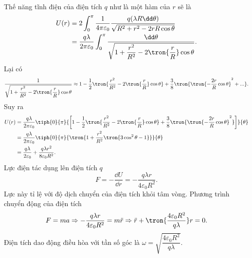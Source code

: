\begin{loigiai}
\begin{center}
\begin{tikzpicture}[x=0.75pt,y=0.75pt,yscale=-1,xscale=1]
\end{tikzpicture}

        \end{center}
        Thế năng tĩnh điện của điện tích $q$ như là một hàm của $r$ sẽ là
        \begin{equation*}
        \begin{aligned}
           U(r)&=2\int_{0}^\pi{\dfrac{1}{4\pi \varepsilon_0}\dfrac{q(\lambda R\dd \theta)}{\sqrt{R^2+r^2-2rR\cos \theta}}}\\
           &=\dfrac{q\lambda}{2\pi \varepsilon_0}\int_0^\pi\dfrac{\dd \theta}{\sqrt{1+\dfrac{r^2}{R^2}-2\tron{\dfrac{r}{R}}\cos \theta}}.
        \end{aligned}
        \end{equation*}
        Lại có 
        \begin{equation*}
            \dfrac{1}{\sqrt{1+\dfrac{r^2}{R^2}-2\tron{\dfrac{r}{R}}\cos\theta}}\approx1-\dfrac{1}{2}\tron{\dfrac{r^2}{R^2}-2\tron{\dfrac{r}{R}}\cos\theta}+\dfrac{3}{8}\tron{\tron{-\dfrac{2r}{R}\cos\theta}^2+...}.
        \end{equation*}
        Suy ra 
        \begin{equation*}
            \begin{aligned}
               U(r)&=\dfrac{q\lambda}{2\pi\varepsilon_0}\tiph{0}{\pi}{\left[1-\dfrac{1}{2}\tron{\frac{r^2}{R^2}-2\tron{\frac{r}{R}}\cos\theta}+\dfrac{3}{8}\tron{\tron{-\dfrac{2r}{R}\cos\theta}^2}\right]}{\theta}\\
               &=\dfrac{q\lambda}{2\pi\varepsilon_0}\tiph{0}{\pi}{\tron{1+\dfrac{r^2}{R^2}\tron{3\cos^2\theta-1}}}{\theta}\\
               &=\dfrac{q\lambda}{2\varepsilon_0}+\dfrac{q\lambda r^2}{8\varepsilon_0R^2}.
            \end{aligned}
        \end{equation*}
        Lực điện tác dụng lên điện tích $q$ 
        \begin{equation*}
            F=-\dfrac{\dd U}{\dd r}=-\dfrac{q\lambda r}{4\varepsilon_0R^2}.
        \end{equation*}
        Lực này tỉ lệ với độ dịch chuyển của điện tích khỏi tâm vòng. Phương trình chuyển động của điện tích
        \begin{equation*}
            F=ma\Rightarrow -\dfrac{q\lambda r}{4\varepsilon_0R^2}=m \ddot r \Rightarrow \ddot r+\tron{\dfrac{4\varepsilon_0R^2}{q\lambda }}r=0.
        \end{equation*}
        Điện tích dao động điều hòa với tần số góc là $\omega=\sqrt{\dfrac{4\varepsilon_0R^2}{q\lambda }}$.
    \end{loigiai}
    
